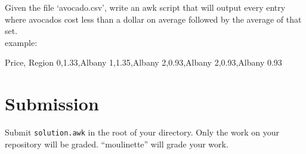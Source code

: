 \documentclass{42-en}
\begin{document}
    Given the file `avocado.csv', write an awk script that will output
    every entry where avocados cost less than a dollar on average followed
    by the average of that set.\\

    example:
    \begin{42console}
Price, Region
0,1.33,Albany
1,1.35,Albany
2,0.93,Albany
2,0.93,Albany
0.93
%
    \end{42console}

\chapter{Submission}

    Submit \texttt{solution.awk} in the root of your directory.
    Only the work on your repository will be graded.
    ``moulinette'' will grade your work.\\
\end{document}
